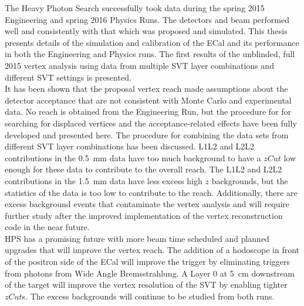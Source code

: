 The Heavy Photon Search successfully took data during the spring 2015 Engineering and spring 2016 Physics Runs. The detectors and beam performed well and consistently with that which was proposed and simulated. This thesis presents details of the simulation and calibration of the ECal and its performance in both the Engineering and Physics runs. The first results of the unblinded, full 2015 vertex analysis using data from multiple SVT layer combinations and different SVT settings is presented. \\
\indent It has been shown that the proposal vertex reach made assumptions about the detector acceptance that are not consistent with Monte Carlo and experimental data. No reach is obtained from the Engineering Run, but the procedure for for searching for displaced vertices and the acceptance-related effects have been fully developed and presented here. The procedure for combining the data sets from different SVT layer combinations has been discussed. L1L2 and L2L2 contributions in the 0.5~mm data have too much background to have a $zCut$ low enough for these data to contribute to the overall reach. The L1L2 and L2L2 contributions in the 1.5~mm data have less excess high $z$ backgrounds, but the statistics of the data is too low to contribute to the reach. Additionally, there are excess background events that contaminate the vertex analysis and will require further study after the improved implementation of the vertex reconstruction code in the near future. \\
\indent HPS has a promising future with more beam time scheduled and planned upgrades that will improve the vertex reach. The addition of a hodoscope in front of the positron side of the ECal will improve the trigger by eliminating triggers from photons from Wide Angle Bremsstrahlung. A Layer 0 at 5~cm downstream of the target will improve the vertex resolution of the SVT by enabling tighter $zCut$s. The excess backgrounds will continue to be studied from both runs. 